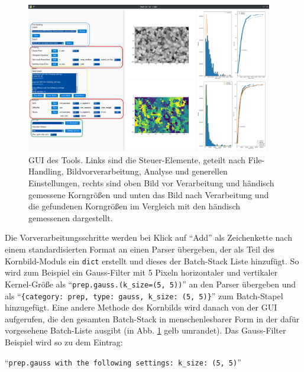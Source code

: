\documentclass[
  12pt,
  openany]{book}
\begin{document}
\begin{figure}

{\centering \includegraphics[width=0.96\textwidth]{../imgs/gui} 

}

\caption[GUI des Tools.]{GUI des Tools. Links sind die Steuer-Elemente, geteilt nach File-Handling, Bildvorverarbeitung, Analyse und generellen Einstellungen, rechts sind oben Bild vor Verarbeitung und händisch gemessene Korngrößen und unten das Bild nach Verarbeitung und die gefundenen Korngrößen im Vergleich mit den händisch gemessenen dargestellt.}\label{fig:grainGUI}
\end{figure}

Die Vorverarbeitungsschritte werden bei Klick auf ``Add'' als Zeichenkette nach einem standardisierten Format an einen Parser übergeben, der als Teil des Kornbild-Moduls ein \texttt{dict} erstellt und dieses der Batch-Stack Liste hinzufügt. So wird zum Beispiel ein Gauss-Filter mit 5 Pixeln horizontaler und vertikaler Kernel-Größe als ``\texttt{prep.gauss.(k\_size=(5,\ 5))}'' an den Parser übergeben und als ``\texttt{\{\textquotesingle{}category\textquotesingle{}:\ \textquotesingle{}prep\textquotesingle{},\ \textquotesingle{}type\textquotesingle{}:\ \textquotesingle{}gauss\textquotesingle{},\ \textquotesingle{}k\_size\textquotesingle{}:\ (5,\ 5)\}}'' zum Batch-Stapel hinzugefügt. Eine andere Methode des Kornbilds wird danach von der GUI aufgerufen, die den gesamten Batch-Stack in menschenlesbarer Form in der dafür vorgesehene Batch-Liste ausgibt (in Abb. \ref{fig:grainGUI} gelb umrandet). Das Gauss-Filter Beispiel wird so zu dem Eintrag:

``\texttt{prep.gauss\ with\ the\ following\ settings:\ k\_size:\ (5,\ 5)}''
\end{document}
